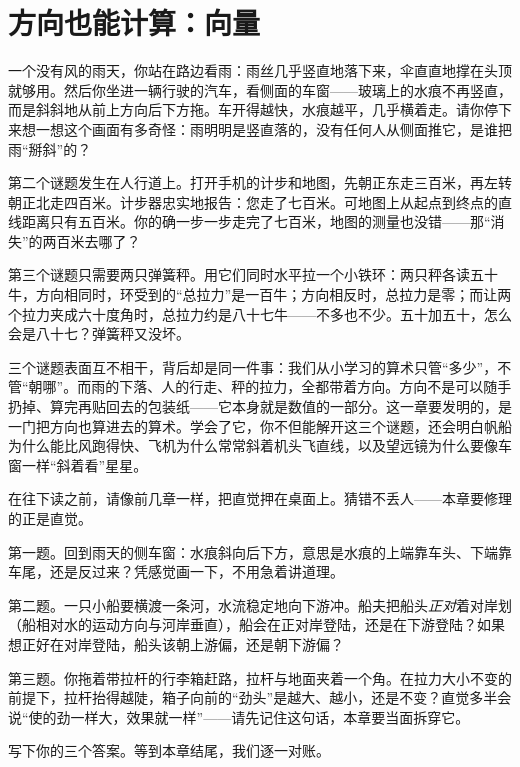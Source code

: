 \chapter{方向也能计算：向量}


\begin{mainline}
一个没有风的雨天，你站在路边看雨：雨丝几乎竖直地落下来，伞直直地撑在头顶就够用。然后你坐进一辆行驶的汽车，看侧面的车窗——玻璃上的水痕不再竖直，而是斜斜地从前上方向后下方拖。车开得越快，水痕越平，几乎横着走。请你停下来想一想这个画面有多奇怪：雨明明是竖直落的，没有任何人从侧面推它，是谁把雨“掰斜”的？

第二个谜题发生在人行道上。打开手机的计步和地图，先朝正东走三百米，再左转朝正北走四百米。计步器忠实地报告：您走了七百米。可地图上从起点到终点的直线距离只有五百米。你的确一步一步走完了七百米，地图的测量也没错——那“消失”的两百米去哪了？

第三个谜题只需要两只弹簧秤。用它们同时水平拉一个小铁环：两只秤各读五十牛，方向相同时，环受到的“总拉力”是一百牛；方向相反时，总拉力是零；而让两个拉力夹成六十度角时，总拉力约是八十七牛——不多也不少。五十加五十，怎么会是八十七？弹簧秤又没坏。

三个谜题表面互不相干，背后却是同一件事：我们从小学习的算术只管“多少”，不管“朝哪”。而雨的下落、人的行走、秤的拉力，全都带着方向。方向不是可以随手扔掉、算完再贴回去的包装纸——它本身就是数值的一部分。这一章要发明的，是一门把方向也算进去的算术。学会了它，你不但能解开这三个谜题，还会明白帆船为什么能比风跑得快、飞机为什么常常斜着机头飞直线，以及望远镜为什么要像车窗一样“斜着看”星星。
\end{mainline}


在往下读之前，请像前几章一样，把直觉押在桌面上。猜错不丢人——本章要修理的正是直觉。

第一题。回到雨天的侧车窗：水痕斜向后下方，意思是水痕的上端靠车头、下端靠车尾，还是反过来？凭感觉画一下，不用急着讲道理。

第二题。一只小船要横渡一条河，水流稳定地向下游冲。船夫把船头\emph{正对}着对岸划（船相对水的运动方向与河岸垂直），船会在正对岸登陆，还是在下游登陆？如果想正好在对岸登陆，船头该朝上游偏，还是朝下游偏？

第三题。你拖着带拉杆的行李箱赶路，拉杆与地面夹着一个角。在拉力大小不变的前提下，拉杆抬得越陡，箱子向前的“劲头”是越大、越小，还是不变？直觉多半会说“使的劲一样大，效果就一样”——请先记住这句话，本章要当面拆穿它。

写下你的三个答案。等到本章结尾，我们逐一对账。


